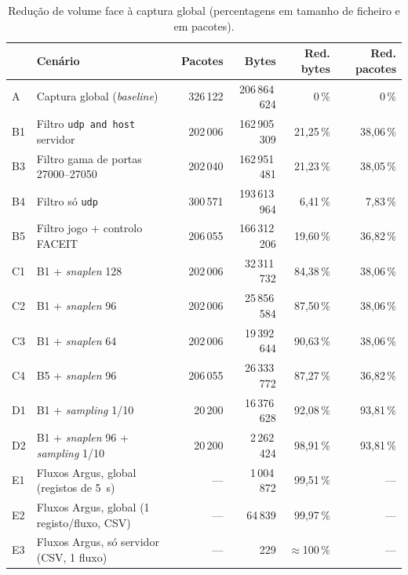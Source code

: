 \documentclass[a4paper,11pt]{article}
\begin{document}
\begin{table}[htbp]
\centering
\caption{Redução de volume face à captura global (percentagens em tamanho de ficheiro e em pacotes).}\label{tab:red}
\small
\begin{tabularx}{\linewidth}{@{}lXrrrr@{}}
\toprule
 & Cenário & Pacotes & Bytes & Red. bytes & Red. pacotes\\
\midrule
A  & Captura global (\emph{baseline})              & 326\,122 & 206\,864\,624 & 0\,\%     & 0\,\%\\
B1 & Filtro \texttt{udp and host} servidor         & 202\,006 & 162\,905\,309 & 21,25\,\% & 38,06\,\%\\
B3 & Filtro gama de portas 27000--27050            & 202\,040 & 162\,951\,481 & 21,23\,\% & 38,05\,\%\\
B4 & Filtro só \texttt{udp}                        & 300\,571 & 193\,613\,964 &  6,41\,\% &  7,83\,\%\\
B5 & Filtro jogo + controlo FACEIT                 & 206\,055 & 166\,312\,206 & 19,60\,\% & 36,82\,\%\\
C1 & B1 + \emph{snaplen} 128                       & 202\,006 &  32\,311\,732 & 84,38\,\% & 38,06\,\%\\
C2 & B1 + \emph{snaplen} 96                        & 202\,006 &  25\,856\,584 & 87,50\,\% & 38,06\,\%\\
C3 & B1 + \emph{snaplen} 64                        & 202\,006 &  19\,392\,644 & 90,63\,\% & 38,06\,\%\\
C4 & B5 + \emph{snaplen} 96                        & 206\,055 &  26\,333\,772 & 87,27\,\% & 36,82\,\%\\
D1 & B1 + \emph{sampling} 1/10                     &  20\,200 &  16\,376\,628 & 92,08\,\% & 93,81\,\%\\
D2 & B1 + \emph{snaplen} 96 + \emph{sampling} 1/10 &  20\,200 &   2\,262\,424 & 98,91\,\% & 93,81\,\%\\
E1 & Fluxos Argus, global (registos de 5~s)        & --- &   1\,004\,872 & 99,51\,\% & ---\\
E2 & Fluxos Argus, global (1 registo/fluxo, CSV)   & --- &      64\,839 & 99,97\,\% & ---\\
E3 & Fluxos Argus, só servidor (CSV, 1 fluxo)      & --- &         229 & $\approx$100\,\% & ---\\
\bottomrule
\end{tabularx}
\end{table}
\end{document}

